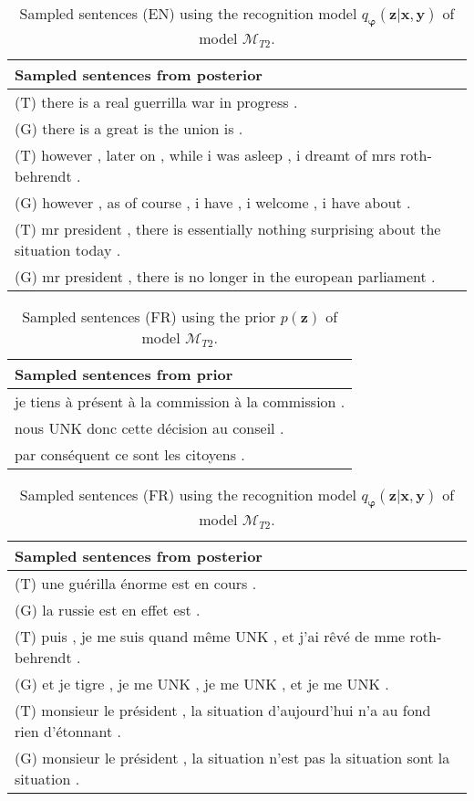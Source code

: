 \begin{table}
  \centering
  \begin{tabular}{|L{14cm}|} 
    \hline
    Sampled sentences from posterior\\ [0.5ex] 
    \hline\hline
    (T) there is a real guerrilla war in progress .\\
    (G) there is a great is the union is .\\
    \hline
    (T) however , later on , while i was asleep , i dreamt of mrs roth-behrendt .\\
    (G) however , as of course , i have , i welcome , i have about .\\
    \hline
    (T) mr president , there is essentially nothing surprising about the situation today .\\
    (G) mr president , there is no longer in the european parliament .\\
    \hline
  \end{tabular}
  \caption{Sampled sentences (EN) using the recognition model
    $q_{\bm{\varphi}}(\bm{z} | \bm{x}, \bm{y})$ of model $\mathcal{M}_{T2}$.}
\end{table}

\begin{table}
  \centering
  \begin{tabular}{|L{14cm}|}
    \hline
    Sampled sentences from prior\\
    \hline\hline
    je tiens à présent à la commission à la commission .\\
    \hline
    nous UNK donc cette décision au conseil .\\
    \hline
    par conséquent ce sont les citoyens .\\
    \hline
  \end{tabular}
  \caption{Sampled sentences (FR) using the prior $p(\bm{z})$ of model $\mathcal{M}_{T2}$.}
\end{table}

\begin{table}
  \centering
  \begin{tabular}{|L{14cm}|} 
    \hline
    Sampled sentences from posterior\\ [0.5ex] 
    \hline\hline
    (T) une guérilla énorme est en cours .\\
    (G) la russie est en effet est .\\
    \hline
    (T) puis , je me suis quand même UNK , et j'ai rêvé de mme roth-behrendt .\\
    (G) et je tigre , je me UNK , je me UNK , et je me UNK .\\
    \hline
    (T) monsieur le président , la situation d'aujourd'hui n'a au fond rien d'étonnant .\\
    (G) monsieur le président , la situation n'est pas la situation sont la situation .\\
    \hline
  \end{tabular}
  \caption{Sampled sentences (FR) using the recognition model
    $q_{\bm{\varphi}}(\bm{z} | \bm{x}, \bm{y})$ of model $\mathcal{M}_{T2}$.}
\end{table}

